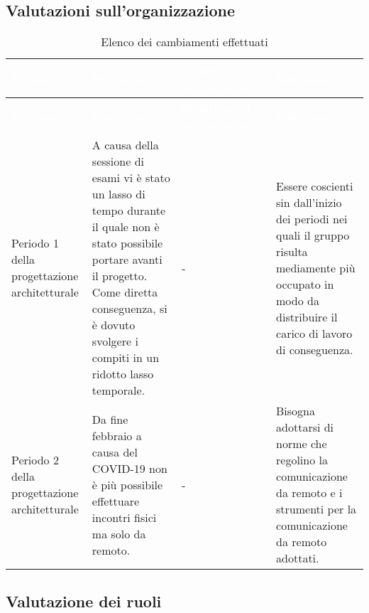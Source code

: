 \subsection{Valutazioni sull'organizzazione}
{
	\renewcommand{\arraystretch}{1.5}
	\centering
	\begin{longtable}{ C{3cm} C{4cm} C{3cm} C{4cm}}
		\caption{Elenco dei cambiamenti effettuati}\\
		\textcolor{white}{\textbf{Periodo}} & \textcolor{white}{\textbf{Problema}} & \textcolor{white}{\textbf{Obiettivo di miglioramento}} & \textcolor{white}{\textbf{Soluzione}}\\
		\endfirsthead
		\textcolor{white}{\textbf{Periodo}} & \textcolor{white}{\textbf{Problema}} &
		\textcolor{white}{\textbf{Obiettivo di miglioramento}} & \textcolor{white}{\textbf{Soluzione}}\\
		\endhead
		Periodo 1 della progettazione architetturale & A causa della sessione di esami vi è stato un lasso di tempo durante il quale non è stato possibile portare avanti il progetto. Come diretta conseguenza, si è dovuto svolgere i compiti in un ridotto lasso temporale. & - & Essere coscienti sin dall'inizio dei periodi nei quali il gruppo risulta mediamente più occupato in modo da distribuire il carico di lavoro di conseguenza. \\
		
		Periodo 2 della progettazione architetturale & Da fine febbraio a causa del COVID-19 non è più possibile effettuare incontri fisici ma solo da remoto. & - & Bisogna adottarsi di norme che regolino la comunicazione da remoto e i strumenti per la comunicazione da remoto adottati. \\
		
	\end{longtable}
}
\newpage

\subsection{Valutazione dei ruoli}

